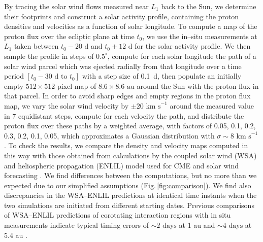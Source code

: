 \documentclass[12pt]{article}
\renewcommand{\deg}{^{\circ}}
\begin{document}
By tracing the solar wind flows measured near $L_1$ back to the Sun, we determine their footprints and construct a solar activity profile, containing the proton densities and velocities as a function of solar longitude. To compute a map of the proton flux over the ecliptic plane at time $t_0$, we use the in--situ measurements at $L_1$ taken between $t_0-20\mbox{ d}$ and $t_0+12\mbox{ d}$ for the solar activity profile. We then sample the profile in steps of $0.5\deg\!$, compute for each solar longitude the path of a solar wind parcel which was ejected radially from that longitude over a time period $\left[t_0-30\mbox{ d}\mbox{ to }t_0\right]$ with a step size of 0.1~d, then populate an initially empty $512\times512\mbox{ pixel}$ map of $8.6\times8.6\mbox{ au}$ around the Sun with the proton flux in that parcel. In order to avoid sharp edges and empty regions in the proton flux map, we vary the solar wind velocity by $\pm20\mbox{ km s}^{-1}$ around the measured value in 7 equidistant steps, compute for each velocity the path, and distribute the proton flux over these paths by a weighted average, with factors of 0.05, 0.1, 0.2, 0.3, 0.2, 0.1, 0.05, which approximates a Gaussian distribution with $\sigma\sim8\mbox{ km s}^{-1}$. To check the results, we compare the density and velocity maps computed in this way with those obtained from calculations by the coupled solar wind (WSA) and heliospheric propagation (ENLIL) model used for CME and solar wind forecasting \cite{ods99a,arg00a}. We find differences between the computations, but no more than we expected due to our simplified assumptions (Fig.\,\ref{fig:comparison}). We find also discrepancies in the WSA–ENLIL predictions at identical time instants when the two simulations are initiated from different starting dates. Previous comparisons of WSA–ENLIL predictions of corotating interaction regions with in situ measurements indicate typical timing errors of $\sim2\mbox{ days}$ at 1 au and $\sim4\mbox{ days}$ at 5.4 au \cite{lee09a,jia11a,pri15a}.
\end{document}
